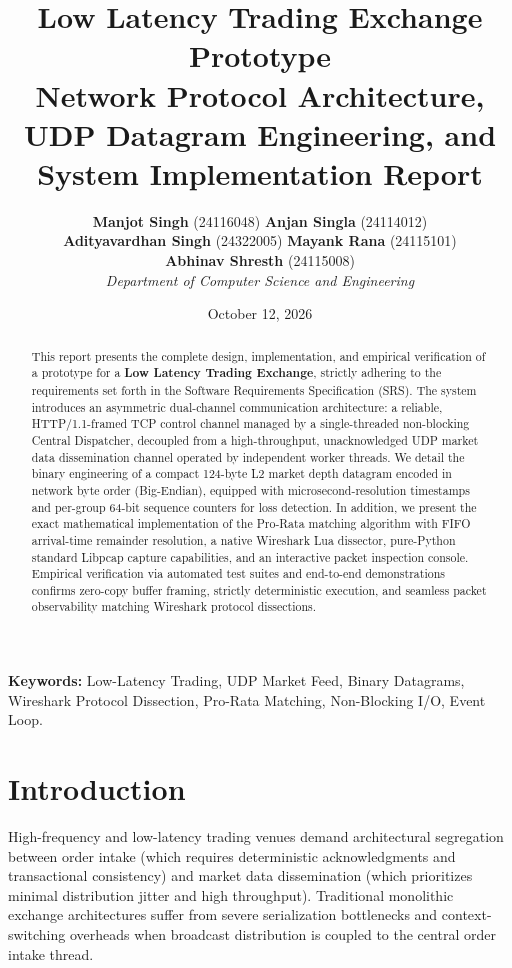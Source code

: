 \documentclass[11pt,a4paper]{article}
\title{\textbf{Low Latency Trading Exchange Prototype}\\
\large Network Protocol Architecture, UDP Datagram Engineering, and System Implementation Report}
\author{
\textbf{Manjot Singh} (24116048) \quad \textbf{Anjan Singla} (24114012)\\
\textbf{Adityavardhan Singh} (24322005) \quad \textbf{Mayank Rana} (24115101)\\
\textbf{Abhinav Shresth} (24115008)\\[0.5em]
\textit{Department of Computer Science and Engineering}
}
\date{October 12, 2026}
\begin{document}
\maketitle

\begin{abstract}
This report presents the complete design, implementation, and empirical verification of a prototype for a \textbf{Low Latency Trading Exchange}, strictly adhering to the requirements set forth in the Software Requirements Specification (SRS). The system introduces an asymmetric dual-channel communication architecture: a reliable, HTTP/1.1-framed TCP control channel managed by a single-threaded non-blocking Central Dispatcher, decoupled from a high-throughput, unacknowledged UDP market data dissemination channel operated by independent worker threads. We detail the binary engineering of a compact 124-byte L2 market depth datagram encoded in network byte order (Big-Endian), equipped with microsecond-resolution timestamps and per-group 64-bit sequence counters for loss detection. In addition, we present the exact mathematical implementation of the Pro-Rata matching algorithm with FIFO arrival-time remainder resolution, a native Wireshark Lua dissector, pure-Python standard Libpcap capture capabilities, and an interactive packet inspection console. Empirical verification via automated test suites and end-to-end demonstrations confirms zero-copy buffer framing, strictly deterministic execution, and seamless packet observability matching Wireshark protocol dissections.
\end{abstract}

\vspace{1em}
\noindent\textbf{Keywords:} Low-Latency Trading, UDP Market Feed, Binary Datagrams, Wireshark Protocol Dissection, Pro-Rata Matching, Non-Blocking I/O, Event Loop.

\newpage
\tableofcontents
\newpage

\section{Introduction}

High-frequency and low-latency trading venues demand architectural segregation between order intake (which requires deterministic acknowledgments and transactional consistency) and market data dissemination (which prioritizes minimal distribution jitter and high throughput). Traditional monolithic exchange architectures suffer from severe serialization bottlenecks and context-switching overheads when broadcast distribution is coupled to the central order intake thread.
\end{document}
